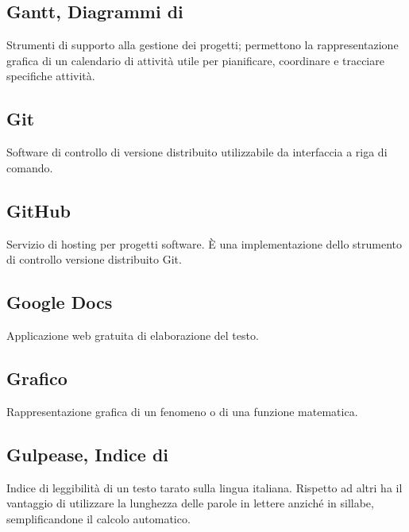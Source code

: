 \documentclass[../glossario.tex]{subfiles}
\begin{document}
\subsection*{Gantt, Diagrammi di}
Strumenti di supporto alla gestione dei progetti; permettono la rappresentazione grafica di un calendario di attività utile per pianificare, coordinare e tracciare specifiche attività.


\subsection*{Git}
Software di controllo di versione distribuito utilizzabile da interfaccia a riga di comando.

\subsection*{GitHub} 
Servizio di hosting per progetti software. È una implementazione dello strumento di controllo versione distribuito Git.

\subsection*{Google Docs} 
Applicazione web gratuita di elaborazione del testo.

\subsection*{Grafico} 
Rappresentazione grafica di un fenomeno o di una funzione matematica.

\subsection*{Gulpease, Indice di}
Indice di leggibilità di un testo tarato sulla lingua italiana. Rispetto ad altri ha il vantaggio di utilizzare la lunghezza delle parole in lettere anziché in sillabe, semplificandone il calcolo automatico.

    
\end{document}
